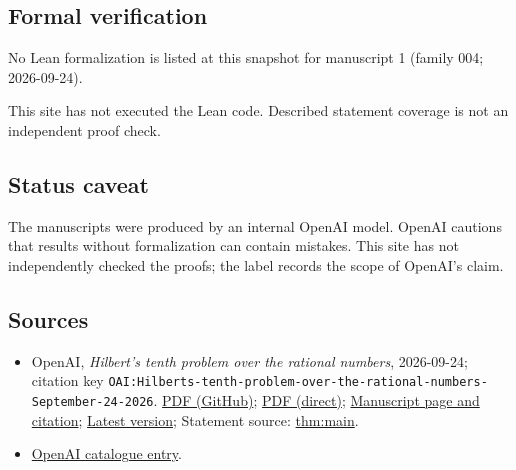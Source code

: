 \documentclass[11pt]{article}
\begin{document}
\subsection{Formal verification}
No Lean formalization is listed at this snapshot for manuscript 1 (family 004; 2026-09-24).

This site has not executed the Lean code. Described statement coverage is not an independent proof check.

\subsection{Status caveat}
The manuscripts were produced by an internal OpenAI model. OpenAI cautions that results without formalization can contain mistakes. This site has not independently checked the proofs; the label records the scope of OpenAI's claim.

\subsection{Sources}
\begin{itemize}
\item OpenAI, \emph{Hilbert's tenth problem over the rational numbers}, 2026-09-24; citation key \texttt{OAI:Hilberts-tenth-problem-over-the-rational-numbers-September-24-2026}. \href{https://github.com/openai/math/blob/adc7f1241b42e322a6451854ab7e4b4c146bf78a/preprints/Hilberts-tenth-problem-over-the-rational-numbers-September-24-2026/main.pdf}{PDF (GitHub)}; \href{https://github.com/openai/math/raw/adc7f1241b42e322a6451854ab7e4b4c146bf78a/preprints/Hilberts-tenth-problem-over-the-rational-numbers-September-24-2026/main.pdf}{PDF (direct)}; \href{https://github.com/openai/math/blob/adc7f1241b42e322a6451854ab7e4b4c146bf78a/preprints/Hilberts-tenth-problem-over-the-rational-numbers-September-24-2026/README.md}{Manuscript page and citation}; \href{https://github.com/openai/math/blob/main/preprints/Hilberts-tenth-problem-over-the-rational-numbers-September-24-2026/main.pdf}{Latest version}; Statement source: \href{https://github.com/openai/math/blob/adc7f1241b42e322a6451854ab7e4b4c146bf78a/preprints/Hilberts-tenth-problem-over-the-rational-numbers-September-24-2026/build/sections/01-introduction.tex\#L7}{thm:main}.
\item \href{https://github.com/openai/math/blob/adc7f1241b42e322a6451854ab7e4b4c146bf78a/CONTENTS.md}{OpenAI catalogue entry}.
\end{itemize}
\end{document}
